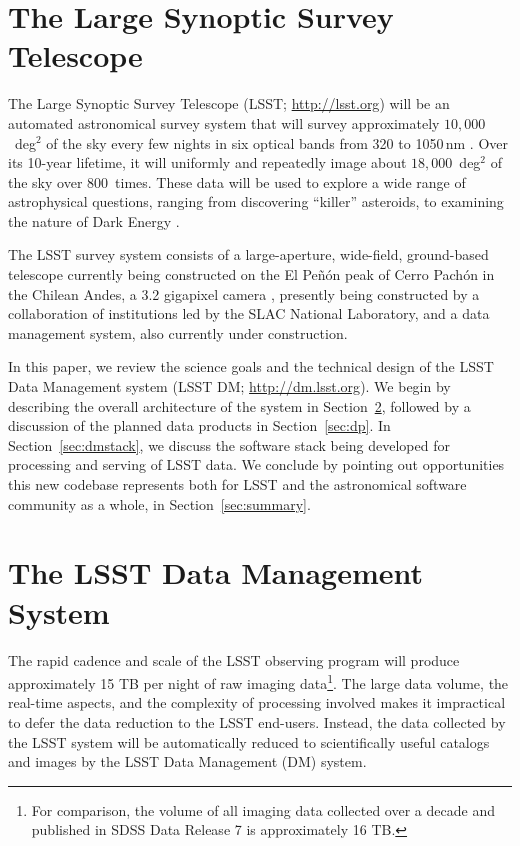 \documentclass[11pt,twoside]{article}
\begin{document}
\section{ The Large Synoptic Survey Telescope }

The Large Synoptic Survey Telescope (LSST; \url{http://lsst.org}) will be an
automated astronomical survey system that will survey approximately
$10,000$~deg$^2$ of the sky every few nights in six optical bands from 320
to 1050\,nm \citep{2008arXiv0805.2366I}. Over its 10-year lifetime, it will
uniformly and repeatedly image about $18,000$~deg$^2$ of the sky
over $800$~times. These data will be used to explore
a wide range of astrophysical questions, ranging from discovering
``killer'' asteroids, to examining the nature of Dark Energy
\citep[e.g., see][]{2009arXiv0912.0201L}.

The LSST survey system consists of a large-aperture, wide-field, ground-based telescope \citep{2014SPIE.9145E..1AG}
currently being constructed on the El Pe\~n\'{o}n peak of Cerro Pach\'{o}n in the Chilean
Andes, a 3.2 gigapixel camera \citep{2010SPIE.7735E..0JK}, presently being constructed by a collaboration
of institutions led by the SLAC National Laboratory, and a data management
system, also currently under construction.

In this paper, we review the science goals and the technical design of the
LSST Data Management system (LSST DM; \url{http://dm.lsst.org}).
We begin by describing the overall architecture of the system in
Section~\ref{sec:dm}, followed by a discussion of the planned data
products in Section~\ref{sec:dp}. In Section~\ref{sec:dmstack}, we
discuss the software stack being developed for processing and serving
of LSST data. We  conclude by pointing out opportunities this new codebase
represents both for LSST and the astronomical software community as
a whole, in Section~\ref{sec:summary}.

\section{ The LSST Data Management System }
\label{sec:dm}

The rapid cadence and scale of the LSST observing program will produce
approximately 15 TB per night of raw imaging data\footnote{For
  comparison, the volume of all imaging data collected over a decade
  and published in SDSS Data Release 7 \citep{2009ApJS..182..543A} is approximately 16 TB.}. The large data volume, the real-time aspects, and the complexity of processing involved makes it impractical to defer the data reduction to the LSST end-users. Instead, the data collected by the LSST system will be automatically reduced to scientifically useful catalogs and images by the LSST Data Management (DM) system.
\\
\end{document}
